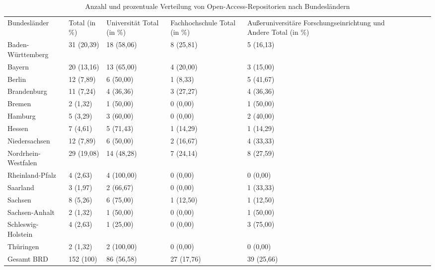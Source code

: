 \documentclass[a4paper,
fontsize=11pt,
oneside,
numbers=noperiodatend,
parskip=half-,
bibliography=totoc,
final
]{scrartcl}
\begin{document}
\begin{table}[ht!]
\small
\centering
\begin{tabular}{p{4cm}p{2.5cm}p{2.5cm}p{2.5cm}p{2.5cm} lrrrr}
  \toprule
 Bundesländer & Total (in \%)  & Universität Total (in \%)  & Fachhochschule Total (in \%)  & Außer\-univer\-sitäre Forschungs\-einrichtung und Andere Total (in \%)  \\ 
\cmidrule(r){1-1} \cmidrule(r){2-2} \cmidrule(r){3-3} \cmidrule(r){4-4} \cmidrule(r){5-5}
Baden-Württemberg & 31 (20,39) & 18 (58,06) & 8 (25,81) & 5 (16,13) \\ 
  Bayern & 20 (13,16) & 13 (65,00) & 4 (20,00) & 3 (15,00) \\ 
  Berlin & 12 (7,89) & 6 (50,00) & 1 (8,33) & 5 (41,67) \\ 
  Brandenburg & 11 (7,24) & 4 (36,36) & 3 (27,27) & 4 (36,36) \\ 
  Bremen & 2 (1,32) & 1 (50,00) & 0 (0,00) & 1 (50,00) \\ 
  Hamburg & 5 (3,29) & 3 (60,00) & 0 (0,00) & 2 (40,00) \\ 
  Hessen & 7 (4,61) & 5 (71,43) & 1 (14,29) & 1 (14,29) \\ 
  Niedersachsen & 12 (7,89) & 6 (50,00) & 2 (16,67) & 4 (33,33) \\ 
  Nordrhein-Westfalen & 29 (19,08) & 14 (48,28) & 7 (24,14) & 8 (27,59) \\ 
  Rheinland-Pfalz & 4 (2,63) & 4 (100,00) & 0 (0,00) & 0 (0,00) \\ 
  Saarland & 3 (1,97) & 2 (66,67) & 0 (0,00) & 1 (33,33) \\ 
  Sachsen & 8 (5,26) & 6 (75,00) & 1 (12,50) & 1 (12,50) \\ 
  Sachsen-Anhalt & 2 (1,32) & 1 (50,00) & 0 (0,00) & 1 (50,00) \\ 
  Schleswig-Holstein & 4 (2,63) & 1 (25,00) & 0 (0,00) & 3 (75,00) \\ 
  Thüringen & 2 (1,32) & 2 (100,00) & 0 (0,00) & 0 (0,00) \\ 
\cmidrule(r){1-1} \cmidrule(r){2-2} \cmidrule(r){3-3} \cmidrule(r){4-4} \cmidrule(r){5-5}
  Gesamt BRD & 152 (100) & 86 (56,58) & 27 (17,76) & 39 (25,66) \\
   \bottomrule
\end{tabular}
\caption{Anzahl und prozentuale Verteilung von Open-Access-Repositorien nach
Bundes\-ländern}
\end{table}
\end{document}
